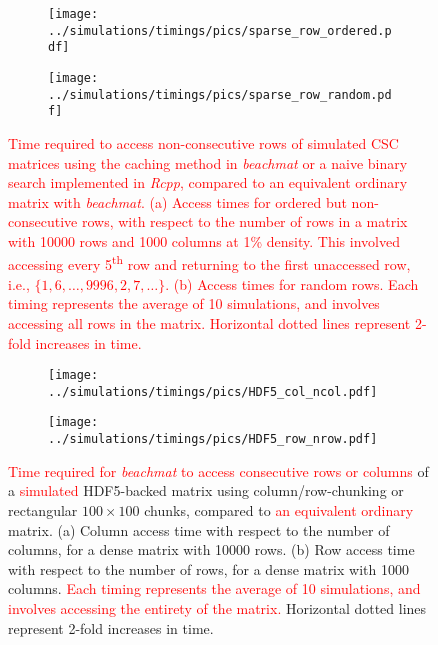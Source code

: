 \documentclass{article}
\newcommand{\beachmat}{\textit{beachmat}}
\newcommand{\revised}[1]{\textcolor{red}{#1}}
\begin{document}
\begin{figure}[bt]
    \centering
    \begin{subfigure}[b]{0.49\textwidth}
        \texttt{[image: ../simulations/timings/pics/sparse\_row\_ordered.pdf]}
        \caption{}
    \end{subfigure}
    \begin{subfigure}[b]{0.49\textwidth}
        \texttt{[image: ../simulations/timings/pics/sparse\_row\_random.pdf]}
        \caption{}
    \end{subfigure}
    \caption{\revised{Time required to access non-consecutive rows of simulated CSC matrices using the caching method in \beachmat{} or a naive binary search implemented in \textit{Rcpp}, compared to an equivalent \revised{ordinary} matrix with \beachmat{}.
        (a) Access times for ordered but non-consecutive rows, with respect to the number of rows in a matrix with 10000 rows and 1000 columns at 1\% density.
        This involved accessing every 5\textsuperscript{th} row and returning to the first unaccessed row, i.e., $\{1, 6, \ldots, 9996, 2, 7, \ldots\}$.
        (b) Access times for random rows.
        Each timing represents the average of 10 simulations, and involves accessing all rows in the matrix.
Horizontal dotted lines represent 2-fold increases in time.}}
    \label{fig:sparserowrandom}
\end{figure}

\begin{figure}[bt]
    \begin{subfigure}[b]{0.49\textwidth}
        \texttt{[image: ../simulations/timings/pics/HDF5\_col\_ncol.pdf]}
        \caption{}
    \end{subfigure}
    \begin{subfigure}[b]{0.49\textwidth}
        \texttt{[image: ../simulations/timings/pics/HDF5\_row\_nrow.pdf]}
        \caption{}
    \end{subfigure}
    \caption{\revised{Time required for \beachmat{} to access consecutive rows or columns} of a \revised{simulated} HDF5-backed matrix using column/row-chunking or rectangular $100\times100$ chunks, compared to \revised{an equivalent ordinary} matrix.
        (a) Column access time with respect to the number of columns, for a dense matrix with 10000 rows.
        (b) Row access time with respect to the number of rows, for a dense matrix with 1000 columns.
        \revised{Each timing represents the average of 10 simulations, and involves accessing the entirety of the matrix.}
        Horizontal dotted lines represent 2-fold increases in time.
    }
    \label{fig:hdf5time}
\end{figure}
\end{document}
